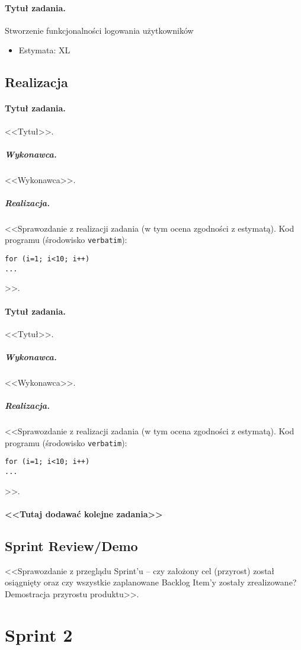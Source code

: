 ﻿\documentclass[a4paper]{article}
\begin{document}
\paragraph{Tytuł zadania.} Stworzenie funkcjonalności logowania użytkowników
\begin{itemize}
\item Estymata: XL
\end{itemize}



\subsection{Realizacja}

\paragraph{Tytuł zadania.} <<Tytuł>>.
\subparagraph{Wykonawca.} <<Wykonawca>>.
\subparagraph{Realizacja.} <<Sprawozdanie z realizacji zadania (w tym ocena zgodności z estymatą). Kod programu (środowisko \texttt{verbatim}): \begin{verbatim}
for (i=1; i<10; i++)
...
\end{verbatim}>>.

\paragraph{Tytuł zadania.} <<Tytuł>>.
\subparagraph{Wykonawca.} <<Wykonawca>>.
\subparagraph{Realizacja.} <<Sprawozdanie z realizacji zadania (w tym ocena zgodności z estymatą). Kod programu (środowisko \texttt{verbatim}): \begin{verbatim}
for (i=1; i<10; i++)
...
\end{verbatim}>>.

\paragraph{<<Tutaj dodawać kolejne zadania>>}


\subsection{Sprint Review/Demo}
<<Sprawozdanie z przeglądu Sprint'u -- czy założony cel (przyrost) został osiągnięty oraz czy wszystkie zaplanowane Backlog Item'y zostały zrealizowane? Demostracja przyrostu produktu>>.

\section{Sprint 2}
\end{document}
